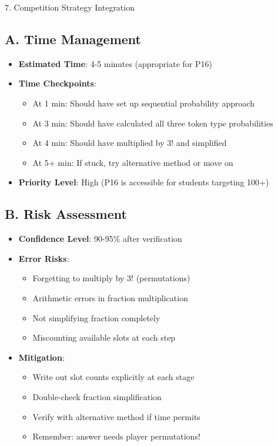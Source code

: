 \documentclass[12pt]{article}
\begin{document}
\begin{competitionbox}{7. Competition Strategy Integration}

\subsection*{A. Time Management}
\begin{itemize}[leftmargin=*]
    \item \textbf{Estimated Time}: 4-5 minutes (appropriate for P16)
    \item \textbf{Time Checkpoints}:
    \begin{itemize}
        \item At 1 min: Should have set up sequential probability approach
        \item At 3 min: Should have calculated all three token type probabilities
        \item At 4 min: Should have multiplied by $3!$ and simplified
        \item At 5+ min: If stuck, try alternative method or move on
    \end{itemize}
    \item \textbf{Priority Level}: High (P16 is accessible for students targeting 100+)
\end{itemize}

\subsection*{B. Risk Assessment}
\begin{itemize}[leftmargin=*]
    \item \textbf{Confidence Level}: 90-95\% after verification
    
    \item \textbf{Error Risks}: 
    \begin{itemize}
        \item Forgetting to multiply by $3!$ (permutations)
        \item Arithmetic errors in fraction multiplication
        \item Not simplifying fraction completely
        \item Miscounting available slots at each step
    \end{itemize}
    
    \item \textbf{Mitigation}:
    \begin{itemize}
        \item Write out slot counts explicitly at each stage
        \item Double-check fraction simplification
        \item Verify with alternative method if time permits
        \item Remember: answer needs player permutations!
    \end{itemize}
    

\end{itemize}
\end{competitionbox}
\end{document}
